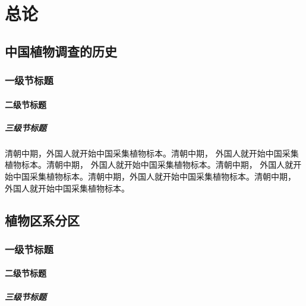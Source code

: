 \documentclass[utf8]{book}
\begin{document}
\renewcommand\contentsname{目~录}

\tableofcontents


\mainmatter


\part{总论}


\chapter{中国植物调查的历史}


\section{一级节标题}


\subsection{二级节标题}


\subsubsection{三级节标题}


\begin{multicols}{2}


清朝中期，外国人就开始中国采集植物标本。清朝中期， 外国人就开始中国采集植物标本。清朝中期， 外国人就开始中国采集植物标本。清朝中期， 外国人就开始中国采集植物标本。清朝中期，外国人就开始中国采集植物标本。清朝中期， 外国人就开始中国采集植物标本。


\end{multicols}


\chapter{植物区系分区}


\section{一级节标题}


\subsection{二级节标题}


\subsubsection{三级节标题}
\end{document}
